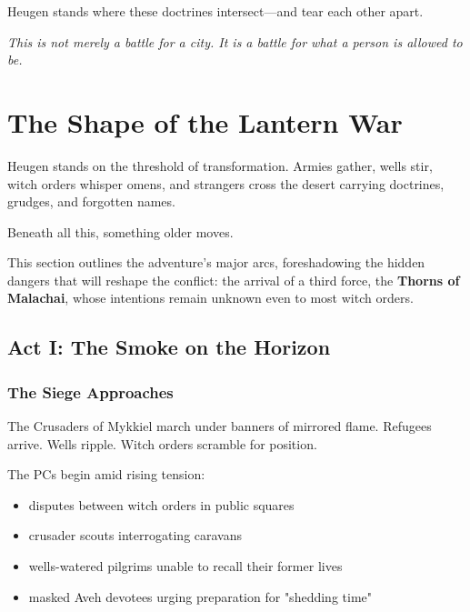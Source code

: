 \documentclass[11pt]{book}
\begin{document}
Heugen stands where these doctrines intersect---and tear each other apart.

\medskip

\begin{center}
\emph{This is not merely a battle for a city.  
It is a battle for what a person is allowed to be.}
\end{center}

\section{The Shape of the Lantern War}

Heugen stands on the threshold of transformation.  
Armies gather, wells stir, witch orders whisper omens, and strangers cross the desert  
carrying doctrines, grudges, and forgotten names.

Beneath all this, something older moves.

This section outlines the adventure's major arcs, foreshadowing the hidden dangers that will
reshape the conflict: the arrival of a third force, the \textbf{Thorns of Malachai}, whose
intentions remain unknown even to most witch orders.

\subsection{Act I: The Smoke on the Horizon}

\subsubsection*{The Siege Approaches}

The Crusaders of Mykkiel march under banners of mirrored flame.  
Refugees arrive. Wells ripple. Witch orders scramble for position.

The PCs begin amid rising tension:
\begin{itemize}[leftmargin=*]
    \item disputes between witch orders in public squares  
    \item crusader scouts interrogating caravans  
    \item wells-watered pilgrims unable to recall their former lives  
    \item masked Aveh devotees urging preparation for "shedding time"  
\end{itemize}
\end{document}
